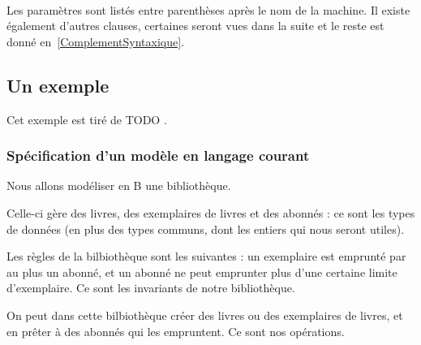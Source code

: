 \documentclass[10pt,a4paper]{article}
\newcommand{\Bequal}{\mathrel{\widehat{=}}}
\begin{document}
\ \\
Les paramètres sont listés entre parenthèses après le nom de la machine. Il existe également d'autres clauses, certaines seront vues dans la suite et le reste est donné en~\cref{ComplementSyntaxique}.

\subsection{Un exemple}

Cet exemple est tiré de TODO .


\subsubsection{Spécification d'un modèle en langage courant}

Nous allons modéliser en B une bibliothèque.

Celle-ci gère des livres, des exemplaires de livres et des abonnés : ce sont les types de données (en plus des types communs, dont les entiers qui nous seront utiles).

Les règles de la bilbiothèque sont les suivantes : un exemplaire est emprunté par au plus un abonné, et un abonné ne peut emprunter plus d'une certaine limite d'exemplaire. Ce sont les invariants de notre bibliothèque.

On peut dans cette bilbiothèque créer des livres ou des exemplaires de livres, et en prêter à des abonnés qui les empruntent. Ce sont nos opérations.
\end{document}
